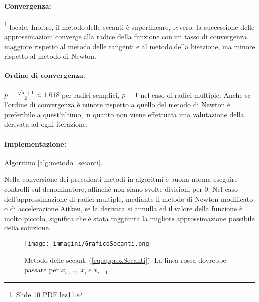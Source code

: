 \paragraph{Convergenza:}\footnote{Slide 10 PDF lez11.} locale. Inoltre, il metodo delle secanti è superlineare, ovvero: la successione delle approssimazioni converge alla radice della funzione con un tasso di convergenza maggiore rispetto al metodo delle tangenti e al metodo della bisezione, ma minore rispetto al metodo di Newton.

\paragraph{Ordine di convergenza:} $p = \frac{\sqrt{5}+1}{2}\approx 1.618$ per radici semplici, $p=1$ nel caso di radici multiple. Anche se l'ordine di convergenza è minore rispetto a quello del metodo di Newton è preferibile a quest'ultimo, in quanto non viene effettuata una valutazione della derivata ad ogni iterazione.

\paragraph{Implementazione:} Algoritmo \ref{alg:metodo_secanti}.

\begin{remark}
	Nella conversione dei precedenti metodi in algoritmi è buona norma eseguire controlli sul denominatore, affinché non siano svolte divisioni per 0. Nel caso dell'approssimazione di radici multiple, mediante il metodo di Newton modificato o di accelerazione Aitken, se la derivata si annulla ed il valore della funzione è molto piccolo, significa che è stata raggiunta la migliore approssimazione possibile della soluzione.
\end{remark}

\begin{figure}
	\centering
	\texttt{[image: immagini/GraficoSecanti.png]}
	\caption{\label{fig:GraficoSecanti} Metodo delle secanti (\ref{eq:approxSecanti}). La linea rossa dovrebbe passare per $x_{i+1},\; x_i\; e\; x_{i-1}$.}
\end{figure}

